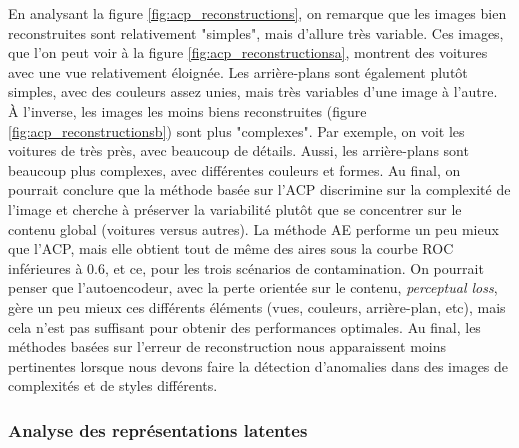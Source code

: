 En analysant la figure \ref{fig:acp_reconstructions}, on remarque que les images bien reconstruites sont relativement "simples", mais d'allure très variable. Ces images, que l'on peut voir à la figure \ref{fig:acp_reconstructionsa}, montrent des voitures avec une vue relativement éloignée. Les arrière-plans sont également plutôt simples, avec des couleurs assez unies, mais très variables d'une image à l'autre. À l'inverse, les images les moins biens reconstruites (figure \ref{fig:acp_reconstructionsb}) sont plus "complexes". Par exemple, on voit les voitures de très près, avec beaucoup de détails. Aussi, les arrière-plans sont beaucoup plus complexes, avec différentes couleurs et formes. Au final, on pourrait conclure que la méthode basée sur l'ACP discrimine sur la complexité de l'image et cherche à préserver la variabilité plutôt que se concentrer sur le contenu global (voitures versus autres). La méthode AE performe un peu mieux que l'ACP, mais elle obtient tout de même des aires sous la courbe ROC inférieures à 0.6, et ce, pour les trois scénarios de contamination. On pourrait penser que l'autoencodeur, avec la perte orientée sur le contenu, \textit{perceptual loss}, gère un peu mieux ces différents éléments (vues, couleurs, arrière-plan, etc), mais cela n'est pas suffisant pour obtenir des performances optimales. Au final, les méthodes basées sur l'erreur de reconstruction nous apparaissent moins pertinentes lorsque nous devons faire la détection d'anomalies dans des images de complexités et de styles différents.
 

\subsubsection{Analyse des représentations latentes} \label{analyse_lat_cars}

